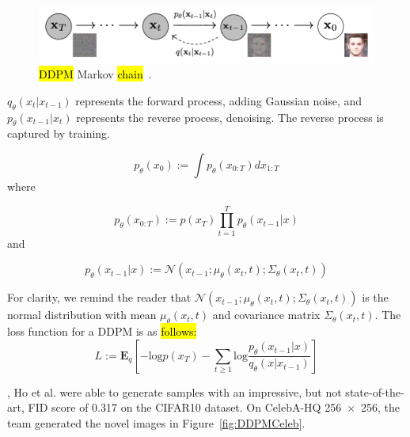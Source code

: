 \documentclass[technologies,article,accept,pdftex,moreauthors]{Definitions/mdpi}
\begin{document}
\begin{figure}[H]
    \includegraphics[width=\columnwidth]{ddpm.png}
    \caption{\label{fig:vae}\hl{DDPM} %
 Markov \hl{chain}~\cite{ho2020denoising}.}
\end{figure}


$q_\theta(x_t|x_{t-1} )$  represents the forward process, adding Gaussian noise, and $p_\theta(x_{t-1}|x_t )$ represents the reverse process, denoising. The reverse process is captured by training.

\begin{equation}
p_\theta(x_0) :=\int p_\theta(x_{0:T} ) dx_{1:T}
\end{equation}
where

\begin{equation}
p_\theta(x_{0:T}) := p(x_T)\prod_{t=1}^{T} p_\theta(x_{t-1}|x)
\end{equation}
and

\begin{equation}
p_\theta(x_{t-1}|x) := \mathcal{N}(x_{t-1};\mu_\theta(x_t,t); \Sigma_\theta(x_t,t))
\end{equation}

For clarity, we remind the reader that $\mathcal{N}(x_{t-1};\mu_\theta(x_t,t); \Sigma_\theta(x_t,t))$ is the normal distribution with mean $\mu_\theta(x_t,t)$ and covariance matrix $\Sigma_\theta(x_t,t)$. The loss function for a DDPM is as \hl{follows:} %
\begin{equation}
L := \mathbf{E}_q[-\mathrm{log} p(x_T) - \sum_{t\ge1}\mathrm{log} \frac{p_\theta(x_{t-1}|x )}{q_\theta(x|x_{t-1} )}]
\end{equation}


, Ho et al. were able to generate samples with an impressive, but not state-of-the-art, FID score of 0.317 on the CIFAR10 dataset. On CelebA-HQ 256~$\times$~256, the team generated the novel images in Figure~\ref{fig:DDPMCeleb}.
\end{document}
